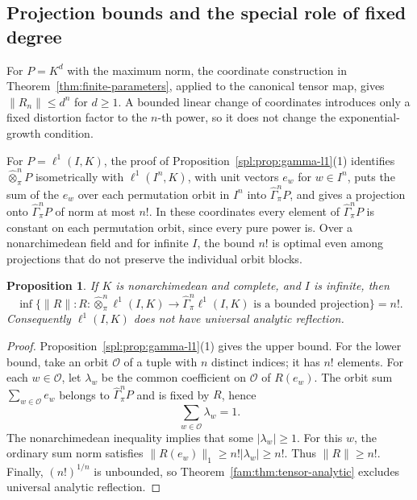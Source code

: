 \documentclass[11pt]{amsart}
\newtheorem{proposition}[theorem]{Proposition}
\theoremstyle{definition}
\theoremstyle{remark}
\numberwithin{equation}{section}
\newcommand{\abs}[1]{\lvert #1\rvert}
\newcommand{\norm}[1]{\lVert #1\rVert}
\theoremstyle{plain}
\theoremstyle{definition}
\theoremstyle{plain}
\begin{document}
\subsection{Projection bounds and the special role of fixed degree}
For $P=K^d$ with the maximum norm, the coordinate construction in
Theorem~\ref{thm:finite-parameters}, applied to the canonical tensor map, gives
$\norm{R_n}\le d^n$ for $d\ge1$. A bounded linear change of coordinates introduces only a fixed
distortion factor to the $n$\nobreakdash-th power, so it does not change the exponential-growth condition.

For $P=\ell^1(I,K)$, the proof of Proposition~\ref{spl:prop:gamma-l1}(1) identifies $\widehat\otimes^n_\pi P$
isometrically with $\ell^1(I^n,K)$, with unit vectors $e_w$ for $w\in I^n$, puts the sum of the $e_w$ over each
permutation orbit in $I^n$ into $\widehat\Gamma^n_\pi P$, and gives a projection onto $\widehat\Gamma^n_\pi P$ of norm
at most $n!$. In these coordinates every element of $\widehat\Gamma^n_\pi P$ is constant on each permutation orbit,
since every pure power is.
Over a nonarchimedean field and for infinite $I$, the bound $n!$ is optimal even among projections that
do not preserve the individual orbit blocks.

\begin{proposition}\label{fam:prop:l1-optimal}
If $K$ is nonarchimedean and complete, and $I$ is infinite, then
\[
 \inf\{\norm R:R\colon \widehat\otimes^n_\pi\ell^1(I,K)\to\widehat\Gamma^n_\pi\ell^1(I,K)
                  \text{ is a bounded projection}\}=n!.
\]
Consequently $\ell^1(I,K)$ does not have universal analytic reflection.
\end{proposition}

\begin{proof}
Proposition~\ref{spl:prop:gamma-l1}(1) gives the upper bound. For the lower bound, take an orbit $\mathcal O$
of a tuple with $n$ distinct indices; it has $n!$ elements. For each $w\in\mathcal O$, let $\lambda_w$
be the common coefficient on $\mathcal O$ of $R(e_w)$.
The orbit sum $\sum_{w\in\mathcal O}e_w$ belongs to $\widehat\Gamma^n_\pi P$ and is fixed by $R$, hence
\[
 \sum_{w\in\mathcal O}\lambda_w=1.
\]
The nonarchimedean inequality implies that some $\abs{\lambda_w}\ge1$.
For this $w$, the ordinary sum norm satisfies
$\norm{R(e_w)}_1\ge n!\abs{\lambda_w}\ge n!$.
Thus $\norm R\ge n!$. Finally, $(n!)^{1/n}$ is unbounded, so
Theorem~\ref{fam:thm:tensor-analytic} excludes universal analytic reflection.
\end{proof}
\end{document}
